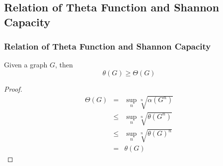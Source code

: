 \subsection*{Relation of Theta Function and Shannon Capacity}
      
      \begin{frame}
            \frametitle{Relation of Theta Function and Shannon Capacity}

            \begin{theorem}
                  Given a graph $ G $, then
                  \begin{equation}
                        \theta(G) \geq \Theta(G)
                  \end{equation}
            \end{theorem}

            \pause

            \begin{proof}
                  \begin{eqnarray}
                        \Theta(G) &=& \sup_{n} \sqrt[n]{\alpha(G^{n})} \\
                        &\leq& \sup_{n} \sqrt[n]{\theta(G^{n})} \\
                        &\leq& \sup_{n} \sqrt[n]{\theta(G)^{n}} \\
                        &=& \theta(G)
                  \end{eqnarray}
            \end{proof}
      \end{frame}